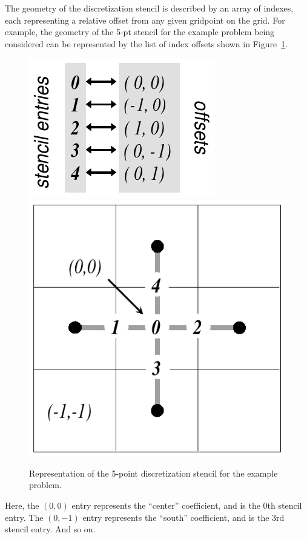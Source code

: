 The geometry of the discretization stencil is described by an array of indexes,
each representing a relative offset from any given gridpoint on the grid.  For
example, the geometry of the 5-pt stencil for the example problem being
considered can be represented by the list of index offsets shown in
Figure~\ref{fig-struct-stencil-a}.
\begin{figure}
\centering
\mbox{}\hfill
\includegraphics[width=.3\textwidth]{figStructStenc0}
\hfill
\includegraphics[width=.25\textwidth]{figStructStenc7}
\hfill\mbox{}
\caption{%
Representation of the 5-point discretization stencil for the example problem.}
\label{fig-struct-stencil-a}
\end{figure}
Here, the $(0,0)$ entry represents the ``center'' coefficient, and is the 0th
stencil entry.  The $(0,-1)$ entry represents the ``south'' coefficient, and is
the 3rd stencil entry.  And so on.

